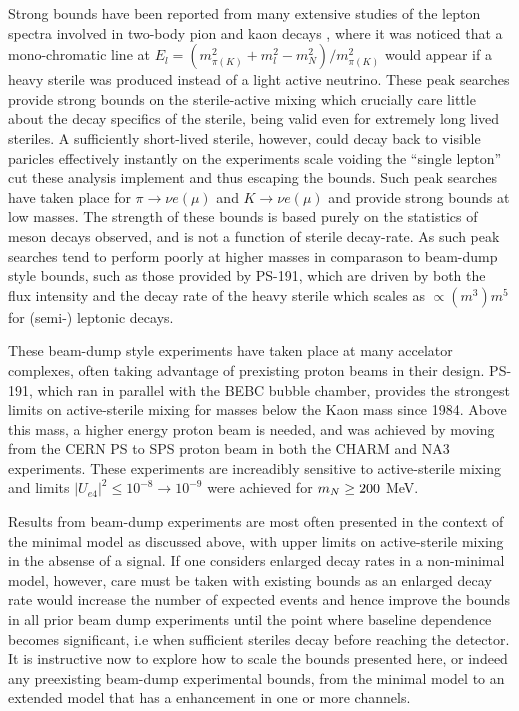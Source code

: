 \documentclass[11pt, a4paper]{article}
\def\ster{\ensuremath N}
\begin{document}
Strong bounds have been reported from many extensive studies of the lepton spectra involved in two-body pion and kaon decays \cite{PhysRevD.46.R885, PhysRevLett.68.3000}, where it was noticed that a
mono-chromatic line at $E_l = \left( m_{\pi
(K)}^2+m_l^2-m_N^2\right)/m_{\pi(K)}^2$ would appear if a heavy sterile was
produced instead of a light active neutrino. These peak searches provide strong bounds on the sterile-active mixing which crucially care little about the decay specifics of the sterile, being valid even for extremely long lived steriles. A sufficiently short-lived
sterile, however, could decay back to visible paricles effectively instantly on the experiments scale voiding the ``single lepton'' cut these analysis implement and thus escaping the
bounds. Such peak searches have taken place for $\pi\rightarrow \nu e (\mu)$ and $K \rightarrow \nu e (\mu)$ and provide strong bounds at low masses. The strength of these bounds is based purely on the statistics of meson decays observed, and is not a function of sterile decay-rate. As such peak searches tend to perform poorly at higher masses in comparason to beam-dump style bounds, such as those provided by PS-191, which are driven by both the flux intensity and the decay rate of the heavy sterile which scales as $\propto (m^3) m^5$ for (semi-) leptonic decays. 

These beam-dump style experiments have taken place at many accelator complexes, often taking advantage of prexisting proton beams in their design. PS-191, which ran in parallel with the BEBC bubble chamber, provides the strongest limits on active-sterile mixing for masses below the Kaon mass since 1984. Above this mass, a higher energy proton beam is needed, and was achieved by moving from the CERN PS to SPS proton beam in both the CHARM \cite{Bergsma:1985is} and NA3 \cite{Badier:1986xz} experiments. These experiments are increadibly sensitive to active-sterile mixing and limits $|U_{e 4}|^2 \leq 10^{-8}\rightarrow10^{-9}$ were achieved for $m_\ster \geq 200$ MeV.

Results from beam-dump experiments are most often presented in the context of the
minimal model as discussed above, with upper limits on active-sterile mixing in the absense of a signal. If one considers enlarged decay rates in
a non-minimal model, however, care must be taken with existing bounds as an enlarged
decay rate would increase the number of expected events and hence improve the
bounds in all prior beam dump experiments until the point where baseline
dependence becomes significant, i.e when sufficient steriles decay before
reaching the detector. It is instructive now to explore how to scale the bounds
presented here, or indeed any preexisting beam-dump experimental bounds, from
the minimal model to an extended model that has a enhancement in one or more
channels.
\end{document}
